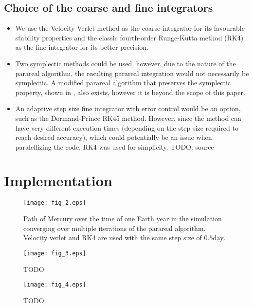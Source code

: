 \documentclass[conference]{IEEEtran}
\begin{document}
\subsection{Choice of the coarse and fine integrators}
\begin{itemize}
    \item We use the Velocity Verlet method as the coarse integrator for its favourable stability properties and the classic fourth-order Runge-Kutta method (RK4) as the fine integrator for its better precision. 
    \item Two symplectic methods could be used, however, due to the nature of the parareal algorithm, the resulting parareal integration would not necessarily be symplectic. A modified parareal algorithm that preserves the symplectic property, shown in \cite{symplecticparareal}, also exists, however it is beyond the scope of this paper.
    \item An adaptive step size fine integrator with error control would be an option, such as the Dormand-Prince RK45 method. However, since the method can have very different execution times (depending on the step size required to reach desired accuracy), which could potentially be an issue when paralellizing the code, RK4 was used for simplicity. {\color{red} TODO: source}
\end{itemize}

\section{Implementation}

\begin{figure}[htbp]
\centerline{\texttt{[image: fig\_2.eps]}}
\caption{Path of Mercury over the time of one Earth year in the simulation converging over multiple iterations of the parareal algorithm. Velocity verlet and RK4 are used with the same step size of $0.5\text{day}$.}
\label{mercury}
\end{figure}

\begin{figure}[htbp]
\centerline{\texttt{[image: fig\_3.eps]}}
\caption{\color{red} TODO}
\label{longrunning}
\end{figure}

\begin{figure}[htbp]
\centerline{\texttt{[image: fig\_4.eps]}}
\caption{\color{red} TODO}
\label{energy}
\end{figure}
\end{document}
